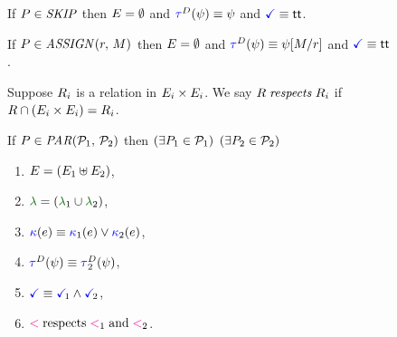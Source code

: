 \begin{figure}
  \raggedright
  
  \noindent
  If $P\in\textnormal{\textit{SKIP}}$ then $E = \emptyset$
  and $\aTr{\bEvs}{\bForm} \riff \bForm$
  and $\aTerm\riff\TRUE$.
  \medskip

  \noindent
  If $\aPS\in\sLET{\aReg}{\aExp}$ then $E = \emptyset$
  and $\aTr{\bEvs}{\bForm} \riff \bForm[\aExp/\aReg]$
  and $\aTerm\riff\TRUE$.  
  \medskip

  \noindent
  Suppose $R_i$ is a relation in $E_i\times E_i$.
  We say $\aRel \rextendsdef{\aRel_i}{}$ if
  $R\cap(E_i\times E_i) = R_i$.
  \medskip

  \noindent
  If $\aPS \in \sPAR{\aPSS_1}{\aPSS_2}$ then  
  $(\exists P_1\in\mathcal{P}_1)$ $(\exists P_2\in\mathcal{P}_2)$
  \begin{multicols}{2}
    \begin{enumerate}[topsep=0pt,label=(\textsc{p}\arabic*),ref=\textsc{p}\arabic*]
    \item \label{par-E}
      $E = (E_1\uplus E_2)$,
    \item \label{par-lambda}
      ${\labeling}=\PBR{{\labeling_1}\cup {\labeling_2}}$, 
    \item \label{par-kappa}
      ${\color{blue}\kappa}(e) \mathrel{\equiv} {\color{blue}\kappa}_1(e)\lor {\color{blue}\kappa}_2(e)$,
    \item \label{par-tau}
      $\aTr{\bEvs}{\bForm} \riff \aTr[2]{\bEvs}{\bForm}$,
    \item \label{par-term}
      $\aTerm \riff \aTerm[1]\land\aTerm[2]$,
    \item \label{par-le}
      ${\lt}\rextends{\lt_1}{\lt_2}$.
    \end{enumerate}
  \end{multicols}
  \medskip


\end{figure}
